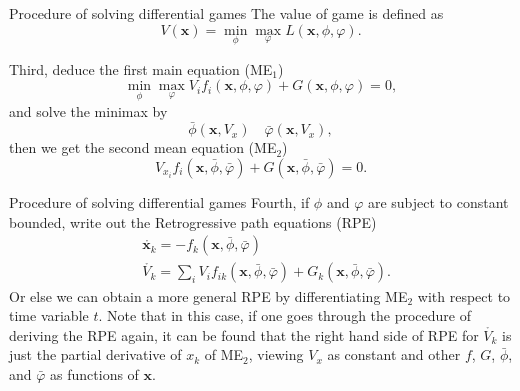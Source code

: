 \documentclass[10pt]{beamer}
\newcommand{\x}{\mathbf{x}}
\begin{document}
\begin{frame}{Procedure of solving differential games}
  The value of game is defined as 
  \begin{equation}
    V(\x) = \min_{\phi} \max_{\varphi} L(\x,\phi,\varphi).
  \end{equation}
  \par 
  Third, deduce the first main equation (ME$_1$)
  \begin{equation}
    \min_{\phi} \max_{\varphi} V_i f_i(\x,\phi,\varphi) + G(\x,\phi,\varphi) = 0,
  \end{equation}
  and solve the minimax by
  \begin{equation}
    \bar{\phi}(\x,V_x)\quad \bar{\varphi}(\x,V_x),
  \end{equation}
  then we get the second mean equation (ME$_2$) 
  \begin{equation}
    V_{x_i}f_i(\x,\bar{\phi},\bar{\varphi}) + G(\x,\bar{\phi},\bar{\varphi}) = 0.
  \end{equation}
\end{frame}

\begin{frame}{Procedure of solving differential games}
  Fourth, if $\phi$ and $\varphi$ are subject to constant bounded, write out the Retrogressive path equations (RPE) 
  \begin{align}
    & \mathring{\x_k} = -f_k(\x,\bar{\phi},\bar{\varphi})\\
    & \mathring{V_k} = \sum_i V_i f_{ik}(\x,\bar{\phi},\bar{\varphi}) + G_k(\x,\bar{\phi},\bar{\varphi}).
  \end{align}
  Or else we can obtain a more general RPE by differentiating ME$_2$ with respect to time variable $t$. Note that in this case, if one goes through the procedure of deriving the RPE again, it can be found that the right hand side of RPE for $\mathring{V_k}$ is just the partial derivative of $x_k$ of ME$_2$, viewing $V_x$ as constant and other $f$, $G$, $\bar{\phi}$, and $\bar{\varphi}$ as functions of $\x$.
\end{frame}
\end{document}
